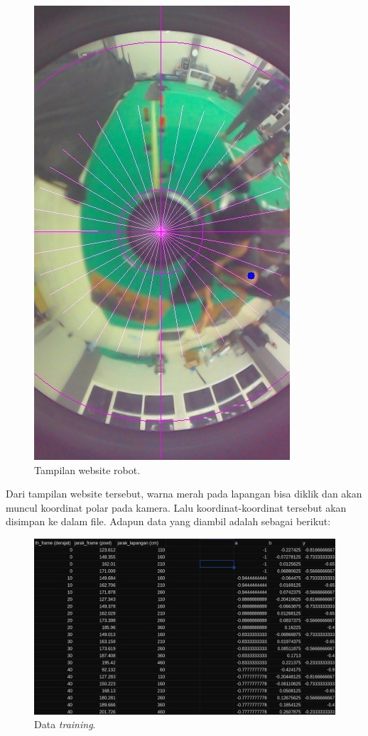 \begin{figure}[H]
  \centering
  \includegraphics[scale=0.8]{gambar/iris_web.jpeg}
  \caption{Tampilan website robot.}
  \label{fig:webrobot}
\end{figure}

Dari tampilan website tersebut, warna merah pada lapangan bisa diklik dan akan muncul koordinat polar pada kamera. Lalu koordinat-koordinat tersebut akan disimpan ke dalam file. Adapun data yang diambil adalah sebagai berikut:
\begin{figure}[H]
  \centering
  \includegraphics[scale=0.50]{gambar/data.jpg}
  \caption{Data \textit{training}.}
  \label{fig:datatraining}
\end{figure}

